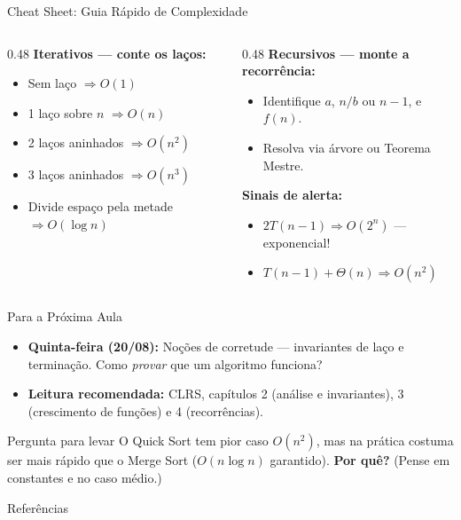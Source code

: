 \documentclass[aspectratio=169]{beamer}
\begin{document}
\begin{frame}{Cheat Sheet: Guia Rápido de Complexidade}
  \begin{columns}[T]
    \begin{column}{0.48\textwidth}
      \textbf{Iterativos --- conte os laços:}
      \begin{itemize}
        \item Sem laço $\Rightarrow O(1)$
        \item 1 laço sobre $n$ $\Rightarrow O(n)$
        \item 2 laços aninhados $\Rightarrow O(n^2)$
        \item 3 laços aninhados $\Rightarrow O(n^3)$
        \item Divide espaço pela metade $\Rightarrow O(\log n)$
      \end{itemize}
    \end{column}
    \begin{column}{0.48\textwidth}
      \textbf{Recursivos --- monte a recorrência:}
      \begin{itemize}
        \item Identifique $a$, $n/b$ ou $n{-}1$, e $f(n)$.
        \item Resolva via árvore ou Teorema Mestre.
      \end{itemize}

      \vspace{0.2cm}
      \textbf{Sinais de alerta:}
      \begin{itemize}
        \item $2T(n{-}1) \Rightarrow O(2^n)$ --- exponencial!
        \item $T(n{-}1) + \Theta(n) \Rightarrow O(n^2)$
      \end{itemize}
    \end{column}
  \end{columns}
\end{frame}

\begin{frame}{Para a Próxima Aula}
  \begin{itemize}
    \item \textbf{Quinta-feira (20/08):} Noções de corretude --- invariantes de laço
      e terminação. Como \emph{provar} que um algoritmo funciona?
    \item \textbf{Leitura recomendada:} CLRS, capítulos 2 (análise e invariantes),
      3 (crescimento de funções) e 4 (recorrências).
  \end{itemize}

  \vspace{0.5cm}
  \begin{block}{Pergunta para levar}
    O Quick Sort tem pior caso $O(n^2)$, mas na prática costuma ser mais rápido
    que o Merge Sort ($O(n \log n)$ garantido). \textbf{Por quê?}
    (Pense em constantes e no caso médio.)
  \end{block}
\end{frame}

\begin{frame}[allowframebreaks]{Referências}
  \small
  \nocite{*}
  
  
\end{frame}
\end{document}

